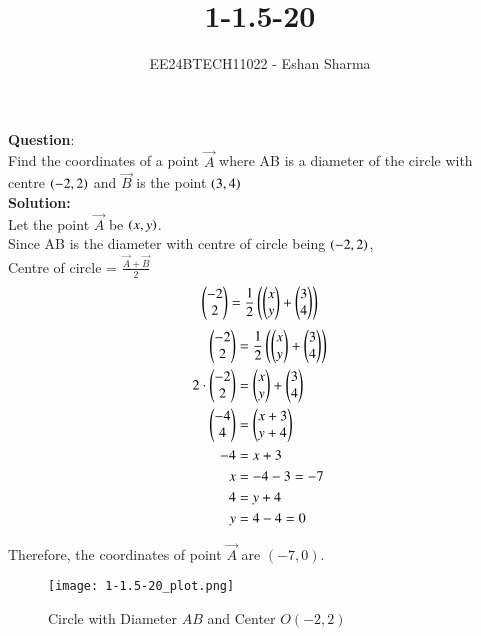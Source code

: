 \documentclass[journal]{IEEEtran}
\begin{document}

\vspace{3cm}

\title{1-1.5-20}
\author{EE24BTECH11022 - Eshan Sharma
}
{\let\newpage\relax\maketitle}

\renewcommand{\thefigure}{\theenumi}
\renewcommand{\thetable}{\theenumi}
\setlength{\intextsep}{10pt} %


\renewcommand{\thetable}{\theenumi}


\textbf{Question}:\\
Find the coordinates of a point $\vec{A}$ where AB is a diameter of the circle with centre $\left(-2,2\right)$ and $\vec{B}$ is the point $\left(3,4\right)$
\\
\textbf{Solution:}\\
Let the point $\vec{A}$ be $\left(x,y\right)$.\\
Since AB is the diameter with centre of circle being $\left(-2,2\right)$,\\
Centre of circle = $\frac{\vec{A}+\vec{B}}{2}$\\

\begin{align}
    \begin{pmatrix}
        -2
        \\
        2
    \end{pmatrix}
    =
    \frac{1}{2} \left(
    \begin{pmatrix}
        x
        \\
        y
    \end{pmatrix}
    +
    \begin{pmatrix}
        3
        \\
        4
    \end{pmatrix}
    \right)
\end{align}
\begin{align}
    \begin{pmatrix}-2 \\ 2\end{pmatrix} &= \frac{1}{2} \left( \begin{pmatrix}x \\ y\end{pmatrix} + \begin{pmatrix}3 \\ 4\end{pmatrix} \right) \\
    2 \cdot \begin{pmatrix}-2 \\ 2\end{pmatrix} &= \begin{pmatrix}x \\ y\end{pmatrix} + \begin{pmatrix}3 \\ 4\end{pmatrix} \\
    \begin{pmatrix}-4 \\ 4\end{pmatrix} &= \begin{pmatrix}x + 3 \\ y + 4\end{pmatrix} \\
    -4 &= x + 3 \\
    x &= -4 - 3 = -7 \\
    4 &= y + 4 \\
    y &= 4 - 4 = 0
\end{align}

Therefore, the coordinates of point $\vec{A}$ are $\boxed{(-7, 0)}$.

\begin{figure}[ht]
    \centering
    \texttt{[image: 1-1.5-20\_plot.png]}
    \caption{Circle with Diameter \( AB \) and Center \( O(-2, 2) \)}
    \label{fig:circle_plot}
\end{figure}
\end{document}
